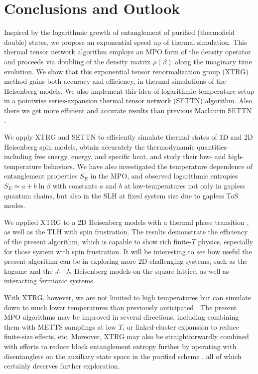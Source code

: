 \documentclass[aps,prx,twocolumn,showpacs,psfig,superscriptaddress,longbibliography]{revtex4-1}
\begin{document}
\section{Conclusions and Outlook} 

Inspired by the logarithmic growth of entanglement of purified
(thermofield double) states, we propose an exponential speed up of
thermal simulation. This thermal tensor network algorithm employs an
MPO form of the density operator and proceeds via doubling of the
density matrix $\rho(\beta)$ along the imaginary time evolution.  We
show that this exponential tensor renormalization group (XTRG)
method gains both accuracy and efficiency, in thermal simulations of
the Heisenberg models. We also implement this idea of logarithmic
temperature setup in a pointwise series-expansion thermal tensor
network (SETTN) algorithm. Also there we get more efficient and
accurate results than previous Maclaurin SETTN
\cite{Chen.b+:2017:SETTN}.

We apply XTRG and SETTN to efficiently simulate thermal states of 1D
and 2D Heisenberg spin models, obtain accurately the thermodynamic
quantities including free energy, energy, and specific heat, and
study their low- and high-temperature behaviors. We have also
investigated the temperature dependence of entanglement properties
$S_E$ in the MPO, and observed logarithmic entropies $S_E\simeq a +
b\ln{\beta}$ with constants $a$ and $b$ at low-temperatures not only
in gapless quantum chains, but also in the SLH at fixed system size due to gapless ToS modes. 

We applied XTRG to a 2D Heisenberg models with a
thermal phase transition {, as well as the TLH with spin frustration}. 
The results demonstrate the efficiency of
the present algorithm,  {which is capable to show rich finite-$T$ physics, 
especially for those system with spin frustration}. 
 {It will be interesting to see how useful the
present algorithm can be in exploring more 2D challenging
systems,} such as the kagome and the
$J_1$--$J_2$ Heisenberg models on the square lattice, as well as
interacting fermionic systems.

With XTRG, however, we are not limited to high temperatures but can
simulate down to much lower temperatures than previously anticipated
\cite{Bruognolo.b+:2017:MPS}. The present MPO algorithms may be
improved in several directions, including combining them with METTS
samplings at low $T$, or linked-cluster expansion to reduce
finite-size effects, etc. Moreover, XTRG may also be
straightforwardly combined with efforts to reduce block entanglement
entropy further by operating with disentanglers on the auxiliary
state space in the purified scheme
\cite{Terhal.b.m+:2002:Entanglement, Hauschild17}, all of which
certainly deserves further exploration.
\end{document}
